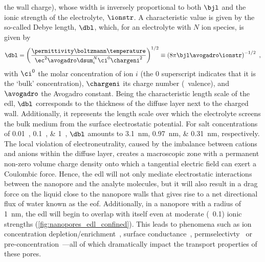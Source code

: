 the wall charge), whose width is inversely proportional to both $\bjl$ and the ionic strength of the
electrolyte, $\ionstr$. A characteristic value is given by the so-called Debye length, $\dbl$, which, for an
electrolyte with $N$ ion species, is given by~\cite{Bocquet-2010}
%
\begin{equation}\label{eq:nanopores_debye_length}
  \dbl = \left(
          \dfrac{ \permittivity \boltzmann \temperature }%
                { \ec^2 \avogadro \dsum_i^N \ci^0 \chargeni^2 } \right)^{1/2}
       \equiv \left( 8 \pi \bjl \avogadro \ionstr \right)^{-1/2}
  \text{ ,}
\end{equation}
%
with $\ci^0$ the molar concentration of ion $i$ (the $0$ superscript indicates that it is the `bulk'
concentration), $\chargeni$ its charge number (\ie~valence), and $\avogadro$ the Avogadro constant. Being the
characteristic length scale of the \gls{edl}, $\dbl$ corresponds to the thickness of the diffuse layer next to
the charged wall. Additionally, it represents the length scale over which the electrolyte screens the bulk
medium from the surface electrostatic potential. For salt concentrations of \SIlist{0.01;0.1;1}{\Molar},
$\dbl$ amounts to \SIlist{3.1;0.97;0.31}{\nm}, respectively. The local violation of electroneutrality, caused
by the imbalance between cations and anions within the diffuse layer, creates a macroscopic zone with a
permanent non-zero volume charge density onto which a tangential electric field can exert a Coulombic force.
Hence, the \gls{edl} will not only mediate electrostatic interactions between the nanopore and the analyte
molecules, but it will also result in a drag force on the liquid close to the nanopore walls that gives rise to a
net directional flux of water known as the \gls{eof}. Additionally, in a nanopore with a radius of
\SI{1}{\nm}, the \gls{edl} will begin to overlap with itself even at moderate (\eg~\SI{0.1}{\Molar}) ionic
strengths (\cref{fig:nanopores_edl_confined}). This leads to phenomena such as ion concentration
depletion/enrichment~\cite{Plecis-2005}, surface conductance~\cite{Stein-2004},
permselectivty~\cite{Plecis-2005} or pre-concentration~\cite{Pu-2004}---all of which dramatically impact the
transport properties of these pores.

